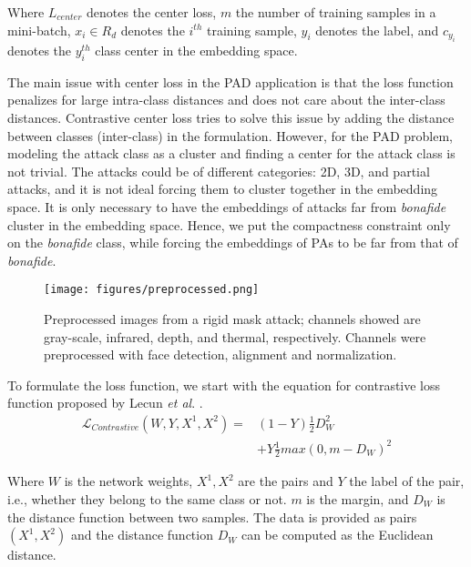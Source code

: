 \documentclass[journal]{IEEEtran}
\begin{document}
Where $L_{center}$ denotes the center loss, $m$ the number of training samples in a mini-batch, $x_i \in R_d$ denotes the $i^{th}$ training sample, $y_i$ denotes the label, and $c_{y_i} $ denotes the $y^{th}_i$ class center in the embedding space.

The main issue with center loss in the PAD application is that the loss function penalizes for large intra-class distances and does not care about the inter-class distances. Contrastive center loss \cite{qi2017contrastive} tries to solve this issue by adding the distance between classes (inter-class) in the formulation. However, for the PAD problem, modeling the attack class as a cluster and finding a center for the attack class is not trivial. The attacks could be of different categories: 2D, 3D, and partial attacks, and it is not ideal forcing them to cluster together in the embedding space. It is only necessary to have the embeddings of attacks far from \textit{bonafide} cluster in the embedding space. Hence, we put the compactness constraint only on the \textit{bonafide} class, while forcing the embeddings of PAs to be far from that of \textit{bonafide}.

\begin{figure*}[h!]
     \centering
         \texttt{[image: figures/preprocessed.png]}

\caption{Preprocessed images from a rigid mask attack; channels showed are gray-scale, infrared, depth, and thermal, respectively. Channels were preprocessed with face detection, alignment and normalization.}
\label{fig:preprocessed}
\end{figure*}

To formulate the loss function, we start with the equation for contrastive loss function proposed by Lecun \textit{et al}. \cite{hadsell2006dimensionality}.
\begin{equation}
\begin{split}
\mathcal{L}_{Contrastive}(W, Y, X^{1}, X^{2})= & (1-Y)\frac{1}{2}D_W^{2}  \\
            & + Y\frac{1}{2}{max(0, m-D_W)}^{2}
\end{split}
\end{equation}

Where $W$ is the network weights, $X^{1}, X^{2}$ are the pairs and $Y$ the label of the pair, i.e., whether they belong to the same class or not. $m$ is the margin, and $D_W$ is the distance function between two samples. The data is provided as pairs $(X^{1}, X^{2})$ and the distance function $D_W$ can be computed as the Euclidean distance.
\end{document}
